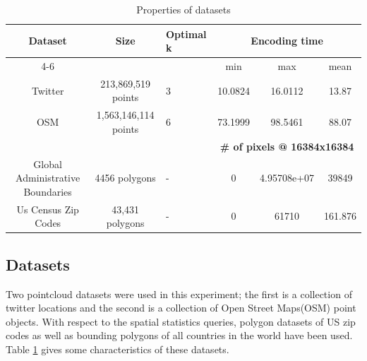 \documentclass[sigconf, nonacm]{acmart}
\begin{document}
\begin{table}[b!]
  \centering
  \begin{tabular}{|c|c|l|c|c|c|}
    \hline
    \multirow{2}{*}{\bfseries Dataset}   &
    \multirow{2}{*}{\bfseries Size}      &
    \multirow{2}{*}{\bfseries Optimal k} &
    \multicolumn{3}{|c|}{\bfseries Encoding time}                                                                                                      \\
    \cline{4-6}                          &                      &   & min                                                        & max         & mean  \\
    \hline
    Twitter                              & 213,869,519 points   & 3 & 10.0824                                                    & 16.0112     & 13.87 \\
    \hline
    OSM                                  & 1,563,146,114 points & 6 & 73.1999                                                    & 98.5461     & 88.07 \\
    \hline
                                         &                      &   & \multicolumn{3}{|c|}{\bfseries \# of pixels @ 16384x16384}                       \\
    \hline
    Global Administrative Boundaries     & 4456 polygons        & - & 0                                                          & 4.95708e+07 & 39849 \\
    \hline
    Us Census Zip Codes                  & 43,431 polygons      & - & 0                                                          & 61710
                                         & 161.876                                                                                                     \\
    \hline
  \end{tabular}
  \caption{Properties of datasets}
  \label{tab:datasets}
\end{table}


\subsection{Datasets}\label{datasets}

Two pointcloud datasets were used in this experiment; the first is a collection of twitter locations and the second is a collection of Open Street Maps(OSM) point objects. With respect to the spatial statistics queries, polygon datasets of US zip codes as well as bounding polygons of all countries in the world have been used.
Table \ref{tab:datasets} gives some characteristics of these datasets.
\end{document}
